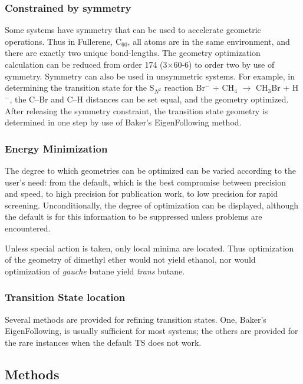 \subsubsection*{Constrained by symmetry}

Some systems have symmetry that can be used to accelerate geometric
operations.  Thus in Fullerene, C$_{60}$, all atoms are in the same
environment, and  there are exactly two unique bond-lengths.  The geometry
optimization  calculation can be reduced from order 174 (3$\times$60-6) to
order two by use of  symmetry.  Symmetry can also be used in unsymmetric
systems.  For example,  in determining the transition state for the S$_{N^2}$
reaction  Br$^-$ + CH$_4$ $\rightarrow$ CH$_3$Br + H$^-$,  the C--Br and C--H
distances can be set equal, and the geometry optimized.  After  releasing the
symmetry constraint, the transition state geometry is determined in  one step
by use of Baker's EigenFollowing method.

\subsubsection*{Energy Minimization}

The degree to which geometries can be optimized can be varied according to the
user's need: from the default, which is the best compromise between precision
and speed, to high precision for publication work, to low precision for rapid
screening.  Unconditionally, the degree of optimization can be displayed,
although the default is for this information to be suppressed unless problems are
encountered.

Unless special action is taken, only local minima are located.  Thus optimization
of the geometry of dimethyl ether would not yield ethanol, nor would
optimization of {\em gauche} butane yield {\em trans} butane.
\subsubsection*{Transition State location}

Several methods are provided for refining transition states.  One, Baker's
EigenFollowing, is usually sufficient for most systems; the others are provided
for the rare instances when the default TS does not work.

\subsection{Methods}


